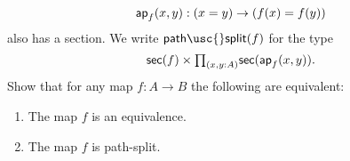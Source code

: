\begin{exercises}
\begin{equation*}
\mathsf{ap}_{f}(x,y):(x=y)\to (f(x)=f(y))
\end{equation*}
also has a section. We write $\mathsf{path\usc{}split}(f)$ for the type
\begin{equation*}
\mathsf{sec}(f)\times\prd{x,y:A}\mathsf{sec}(\apfunc{f}(x,y)).
\end{equation*}
Show that for any map $f:A\to B$ the following are equivalent:
\begin{enumerate}
\item The map $f$ is an equivalence.
\item The map $f$ is path-split.
\end{enumerate}
\begin{comment}
\item \label{ex:eqv_sigma_mv}Consider a map
\begin{equation*}
f:A \to \sm{y:B}C(y).
\end{equation*}
\begin{subexenum}
\item Construct a family of maps
\begin{equation*}
f':\prd{y:B} \fib{\proj 1\circ f}{y}\to C(y).
\end{equation*}
\item Construct an equivalence
\begin{equation*}
\eqv{\fib{f'(b)}{c}}{\fib{f}{(b,c)}}
\end{equation*}
for every $(b,c):\sm{y:B}C(y)$.
\item Conclude that the following are equivalent:
\begin{enumerate}
\item $f$ is an equivalence.
\item $f'$ is a family of equivalences.
\end{enumerate}
\end{subexenum}
\item \label{ex:coh_intro}Consider a type $A$ with base point $a:A$, and let $B$ be a type family on $A$ that implies the identity type, i.e., there is a term
\begin{equation*}
\alpha : \prd{x:A} B(x)\to (a=x).
\end{equation*}
Show that the \define{coherence reduction map}
\begin{equation*}
\mathsf{coh\usc{}red} : \Big(\sm{y:B(a)}\alpha(a,y)=\refl{a}\Big) \to \Big(\sm{x:A}B(x)\Big)
\end{equation*}

\end{comment}
\end{exercises}
